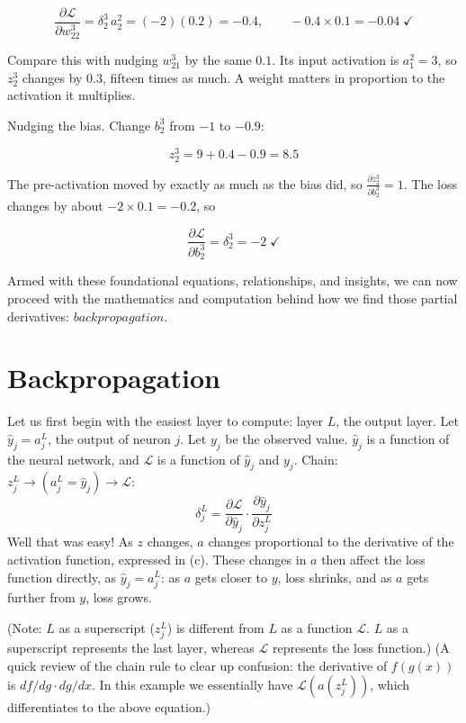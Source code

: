 \documentclass{article}
\begin{document}
\[\frac{\partial \mathcal{L}}{\partial w^3_{22}} = \delta^3_2 \, a^2_2 = (-2)(0.2) = -0.4, \qquad -0.4 \times 0.1 = -0.04 \;\checkmark\]

Compare this with nudging $w^3_{21}$ by the same $0.1$. Its input activation is $a^2_1 = 3$, so $z^3_2$ changes by $0.3$, fifteen times as much. A weight matters in proportion to the activation it multiplies.

Nudging the bias. Change $b^3_2$ from $-1$ to $-0.9$:

\[z^3_2 = 9 + 0.4 - 0.9 = 8.5\]

The pre-activation moved by exactly as much as the bias did, so $\frac{\partial z^3_2}{\partial b^3_2} = 1$. The loss changes by about $-2 \times 0.1 = -0.2$, so

\[\frac{\partial \mathcal{L}}{\partial b^3_2} = \delta^3_2 = -2 \;\checkmark\]

Armed with these foundational equations, relationships, and insights, we can now proceed with the mathematics and computation behind how we find those partial derivatives: $\textit{backpropagation.}$

\section*{Backpropagation}

Let us first begin with the easiest layer to compute: layer $L$, the output layer. Let $\hat{y}_j = a^L_j$, the output of neuron $j$. Let $y_j$ be the observed value. $\hat{y}_j$ is a function of the neural network, and $\mathcal{L}$ is a function of $\hat{y}_j$ and $y_j$. Chain: $z^L_j \to (a^L_j = \hat{y}_j) \to \mathcal{L}$:
\[\delta^L_j = \frac{\partial \mathcal{L}}{\partial \hat{y}_j}\cdot\frac{\partial \hat{y}_j}{\partial z^L_j}\]
Well that was easy! As $z$ changes, $a$ changes proportional to the derivative of the activation function, expressed in (c). These changes in $a$ then affect the loss function directly, as $\hat{y}_j = a^L_j$: as $a$ gets closer to $y$, loss shrinks, and as $a$ gets further from $y$, loss grows.

(Note: $L$ as a superscript ($z^L_j$) is different from $L$ as a function $\mathcal{L}$. $L$ as a superscript represents the last layer, whereas $\mathcal{L}$ represents the loss function.)
(A quick review of the chain rule to clear up confusion: the derivative of $f(g(x))$ is $df/dg \cdot dg/dx$. In this example we essentially have $\mathcal{L}(a(z^L_j))$, which differentiates to the above equation.)
\end{document}
